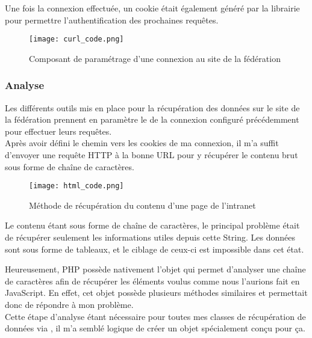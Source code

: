 Une fois la connexion effectuée, un cookie était également généré par la librairie pour permettre l’authentification des prochaines requêtes.

\newpage

\begin{figure}[!h]
    \centering
    \texttt{[image: curl\_code.png]}
    \caption{Composant de paramétrage d'une connexion au site de la fédération}
\end{figure}

\newpage

\subsubsection{Analyse}
\vspace{1cm}

Les différents outils mis en place pour la récupération des données sur le site de la fédération prennent en paramètre le  de la connexion configuré précédemment pour effectuer leurs requêtes.\\

Après avoir défini le chemin vers les cookies de ma connexion, il m’a suffit d’envoyer une requête HTTP à la bonne URL pour y récupérer le contenu brut sous forme de chaîne de caractères.

\begin{figure}[!h]
    \centering
    \texttt{[image: html\_code.png]}
    \caption{Méthode de récupération du contenu d'une page de l'intranet}
\end{figure}

\vspace{0.5cm}

Le contenu étant sous forme de chaîne de caractères, le principal problème était de récupérer seulement les informations utiles depuis cette String. Les données sont sous forme de tableaux, et le ciblage de ceux-ci est impossible dans cet état.

Heureusement, PHP possède nativement l’objet  qui permet d’analyser une chaîne de caractères afin de récupérer les éléments voulus comme nous l’aurions fait en JavaScript. 
En effet, cet objet possède plusieurs méthodes similaires et permettait donc de répondre à mon problème.\\

Cette étape d’analyse étant nécessaire pour toutes mes classes de récupération de données via  , il m’a semblé logique de créer un objet spécialement conçu pour ça.

